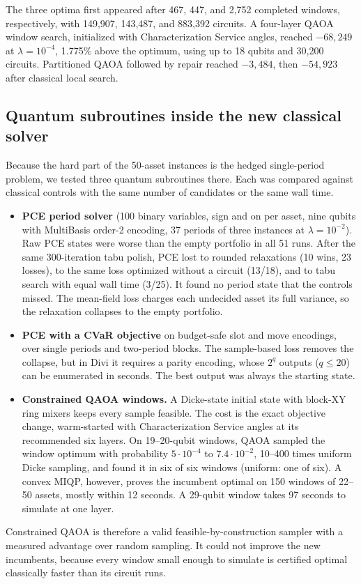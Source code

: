 \documentclass[a4paper]{article}
\begin{document}
The three optima first appeared after 467, 447, and 2,752 completed windows, respectively,
with 149,907, 143,487, and 883,392 circuits.
A four-layer QAOA window search, initialized with Characterization Service angles, reached \(-68{,}249\)
at \(\lambda=10^{-4}\), 1.775\% above the optimum, using up to 18 qubits and 30,200 circuits.
Partitioned QAOA followed by repair reached \(-3{,}484\), then \(-54{,}923\) after classical local search.

\subsection{Quantum subroutines inside the new classical solver}

Because the hard part of the 50-asset instances is the hedged single-period problem, we tested three quantum
subroutines there. Each was compared against classical controls with the same number of candidates or the same wall time.
\begin{itemize}
\item \textbf{PCE period solver} (100 binary variables, sign and on per asset, nine qubits with MultiBasis order-2 encoding, 37 periods
of three instances at \(\lambda=10^{-2}\)). Raw PCE states were worse than the empty portfolio in all 51 runs. After the
same 300-iteration tabu polish, PCE lost to rounded relaxations (10 wins, 23 losses), to the same loss optimized without a circuit
(13/18), and to tabu search with equal wall time (3/25). It found no period state that the controls missed. The mean-field loss
charges each undecided asset its full variance, so the relaxation collapses to the empty portfolio.
\item \textbf{PCE with a CVaR objective} on budget-safe slot and move encodings, over single periods and two-period blocks.
The sample-based loss removes the collapse, but in Divi it requires a parity encoding, whose \(2^q\) outputs (\(q\le20\)) can be
enumerated in seconds. The best output was always the starting state.
\item \textbf{Constrained QAOA windows.} A Dicke-state initial state with block-XY ring mixers keeps every sample feasible.
The cost is the exact objective change, warm-started with Characterization Service angles at its recommended six layers.
On 19--20-qubit windows, QAOA sampled the window optimum with probability \(5\cdot10^{-4}\) to \(7.4\cdot10^{-2}\),
10--400 times uniform Dicke sampling, and found it in six of six windows (uniform: one of six).
A convex MIQP, however, proves the incumbent optimal on 150 windows of 22--50 assets, mostly within 12 seconds.
A 29-qubit window takes 97 seconds to simulate at one layer.
\end{itemize}
Constrained QAOA is therefore a valid feasible-by-construction sampler with a measured advantage over random sampling.
It could not improve the new incumbents, because every window small enough to simulate is certified optimal classically faster than its circuit runs.
\end{document}
